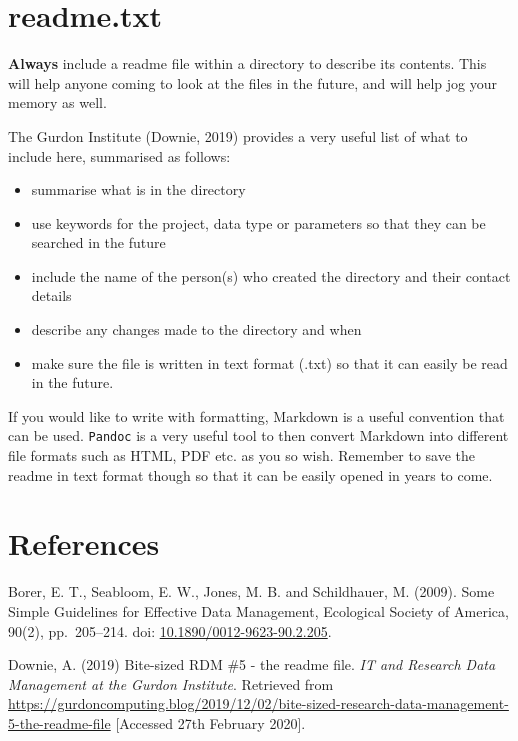 \documentclass[a4paper,oneside]{report}
\providecommand{\tightlist}{%
  \setlength{\itemsep}{0pt}\setlength{\parskip}{0pt}}
\begin{document}
\hypertarget{readme.txt}{%
\section{readme.txt}\label{readme.txt}}

\textbf{Always} include a readme file within a directory to describe its
contents. This will help anyone coming to look at the files in the
future, and will help jog your memory as well.

The Gurdon Institute (Downie, 2019) provides a very useful list of what
to include here, summarised as follows:

\begin{itemize}
\tightlist
\item
  summarise what is in the directory
\item
  use keywords for the project, data type or parameters so that they can
  be searched in the future
\item
  include the name of the person(s) who created the directory and their
  contact details
\item
  describe any changes made to the directory and when
\item
  make sure the file is written in text format (.txt) so that it can
  easily be read in the future.
\end{itemize}

If you would like to write with formatting, Markdown is a useful
convention that can be used. \texttt{Pandoc} is a very useful tool to
then convert Markdown into different file formats such as HTML, PDF etc.
as you so wish. Remember to save the readme in text format though so
that it can be easily opened in years to come.

\hypertarget{references-1}{%
\section{References}\label{references-1}}

Borer, E. T., Seabloom, E. W., Jones, M. B. and Schildhauer, M. (2009).
Some Simple Guidelines for Effective Data Management, Ecological Society
of America, 90(2), pp.~205--214. doi:
\href{https://doi.org/10.1890/0012-9623-90.2.205}{10.1890/0012-9623-90.2.205}.

Downie, A. (2019) Bite-sized RDM \#5 - the readme file. \emph{IT and
Research Data Management at the Gurdon Institute}. Retrieved from
\href{https://gurdoncomputing.blog/2019/12/02/bite-sized-research-data-management-5-the-readme-file/}{https://gurdoncomputing.blog/2019/12/02/bite-sized-research-data-management-5-the-readme-file}
{[}Accessed 27th February 2020{]}.
\end{document}
